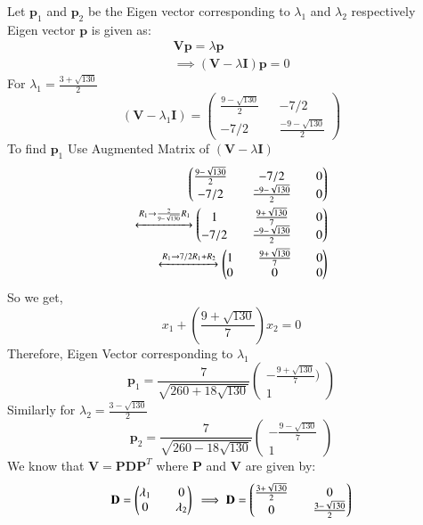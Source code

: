 \documentclass[journal,13pt,twocolumn]{IEEEtran}
\newcommand{\myvec}[1]{\ensuremath{\begin{pmatrix}#1\end{pmatrix}}}
\renewcommand{\vec}[1]{\mathbf{#1}}
\begin{document}
Let $\vec{p}_1$ and $\vec{p}_2$ be the Eigen vector corresponding to $\lambda_1$ and $\lambda_2$ respectively\\
Eigen vector $\vec{p}$ is given as:
\begin{equation} \label{2.27}
\begin{split}
\vec{V}\vec{p} = \lambda\vec{p}\\
\implies (\vec{V} - \lambda \vec{I})\vec{p} = 0
\end{split}
\end{equation}
For $\lambda_1 = \frac{3+\sqrt{130}}{2}$
\begin{equation}\label{2.28}
(\vec{V} - \lambda_1 \vec{I}) = \myvec{\frac{9-\sqrt{130}}{2} && -7/2\\ -7/2 && \frac{-9-\sqrt{130}}{2}}
\end{equation}
To find $ \vec{p}_1 $ Use Augmented Matrix of $(\vec{V} - \lambda \vec{I})$
\begin{equation} \label{2.29}
\begin{split}
 \myvec{\frac{9-\sqrt{130}}{2} && -7/2 && 0\\ -7/2 && \frac{-9-\sqrt{130}}{2} && 0}\\
\xleftrightarrow[]{R_1\rightarrow \frac{2}{9-\sqrt{130}}R_1} 
\myvec{1 && \frac{9+\sqrt{130}}{7} && 0\\ -7/2 && \frac{-9-\sqrt{130}}{2} && 0}\\
\xleftrightarrow[]{R_1\rightarrow 7/2R_1+R_2} 
\myvec{1 && \frac{9+\sqrt{130}}{7} && 0\\ 0 && 0 && 0} 
\end{split}
\end{equation}
So we get,
\begin{equation} \label{2.30}
x_1 + (\frac{9+\sqrt{130}}{7})x_2 = 0
\end{equation}
Therefore, Eigen Vector corresponding to $\lambda_1$
\begin{equation} \label{2.31}
\vec{p}_1 =\frac{7}{\sqrt{260+18\sqrt{130}}} \myvec{-\frac{9+\sqrt{130}}{7}) \\ 1}
\end{equation}
Similarly for $\lambda_2 = \frac{3-\sqrt{130}}{2}$
\begin{equation}\label{2.32}
\vec{p}_2 =\frac{7}{\sqrt{260-18\sqrt{130}}} \myvec{-\frac{9-\sqrt{130}}{7} \\ 1}
\end{equation}
We know that $\vec{V} = \vec{P}\vec{D}\vec{P}^T$ where $\vec{P}$ and $\vec{V}$ are given by:
\begin{equation}\label{2.33}
\vec{D} = \myvec{\lambda_1 && 0\\ 0 && \lambda_2}\\
\implies \vec{D} = \myvec{\frac{3+\sqrt{130}}{2} && 0\\ 0 &&\frac{3-\sqrt{130}}{2} }
\end{equation}
\end{document}
